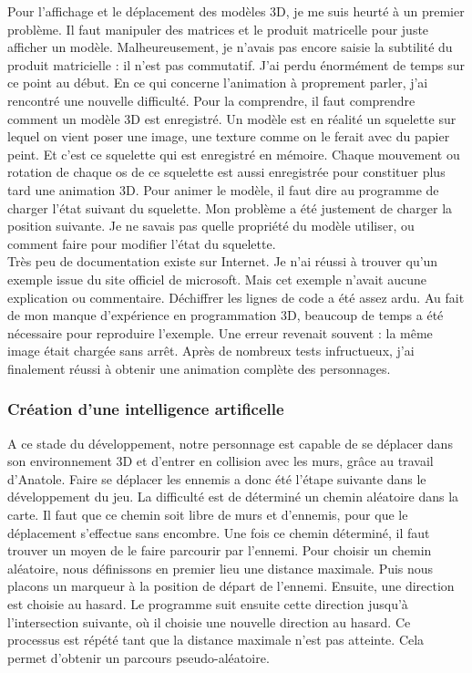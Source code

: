 \documentclass[12pt]{article}
\begin{document}
Pour l'affichage et le déplacement des modèles 3D, je me suis heurté à un premier problème. Il faut manipuler des matrices et le produit matricelle pour juste afficher un modèle. Malheureusement, je n'avais pas encore saisie la subtilité du produit matricielle : il n'est pas commutatif. J'ai perdu énormément de temps sur ce point au début. En ce qui concerne l'animation à proprement parler, j'ai rencontré une nouvelle difficulté. Pour la comprendre, il faut comprendre comment un modèle 3D est enregistré. Un modèle est en réalité un squelette sur lequel on vient poser une image, une texture comme on le ferait avec du papier peint. Et c'est ce squelette qui est enregistré en mémoire. Chaque mouvement ou rotation de chaque os de ce squelette est aussi enregistrée pour constituer plus tard une animation 3D. Pour animer le modèle, il faut dire au programme de charger l'état suivant du squelette. Mon problème a été justement de charger la position suivante. Je ne savais pas quelle propriété du modèle utiliser, ou comment faire pour modifier l'état du squelette. \\
Très peu de documentation existe sur Internet. Je n'ai réussi à trouver qu'un exemple issue du site officiel de microsoft. Mais cet exemple n'avait aucune explication ou commentaire. Déchiffrer les lignes de code a été assez ardu. Au fait de mon manque d'expérience en programmation 3D, beaucoup de temps a été nécessaire pour reproduire l'exemple. Une erreur revenait souvent : la même image était chargée sans arrêt. Après de nombreux tests infructueux, j'ai finalement réussi à obtenir une animation complète des personnages.

\newpage

\subsubsection{Création d'une intelligence artificelle}

A ce stade du développement, notre personnage est capable de se déplacer dans son environnement 3D et d'entrer en collision avec les murs, grâce au travail d'Anatole. Faire se déplacer les ennemis a donc été l'étape suivante dans le développement du jeu. La difficulté est de déterminé un chemin aléatoire dans la carte. Il faut que ce chemin soit libre de murs et d'ennemis, pour que le déplacement s'effectue sans encombre. Une fois ce chemin déterminé, il faut trouver un moyen de le faire parcourir par l'ennemi. Pour choisir un chemin aléatoire, nous définissons en premier lieu une distance maximale. Puis nous placons un marqueur à la position de départ de l'ennemi. Ensuite, une direction est choisie au hasard. Le programme suit ensuite cette direction jusqu'à l'intersection suivante, où il choisie une nouvelle direction au hasard. Ce processus est répété tant que la distance maximale n'est pas atteinte. Cela permet d'obtenir un parcours pseudo-aléatoire. 
\end{document}
